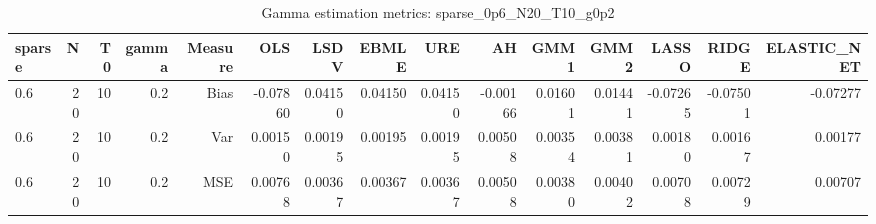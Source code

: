 \begin{table}[!htbp]\centering
\caption{Gamma estimation metrics: sparse_0p6_N20_T10_g0p2}
\label{tab:table1_sparse_0p6_N20_T10_g0p2}
\begin{tabular}{lrrrrrrrrrrrrrr}
\hline
sparse & N & T0 & gamma & Measure & OLS & LSDV & EBMLE & URE & AH & GMM1 & GMM2 & LASSO & RIDGE & ELASTIC_NET \\
\hline
0.6 & 20 & 10 & 0.2 & Bias & -0.07860 & 0.04150 & 0.04150 & 0.04150 & -0.00166 & 0.01601 & 0.01441 & -0.07265 & -0.07501 & -0.07277 \\
0.6 & 20 & 10 & 0.2 & Var & 0.00150 & 0.00195 & 0.00195 & 0.00195 & 0.00508 & 0.00354 & 0.00381 & 0.00180 & 0.00167 & 0.00177 \\
0.6 & 20 & 10 & 0.2 & MSE & 0.00768 & 0.00367 & 0.00367 & 0.00367 & 0.00508 & 0.00380 & 0.00402 & 0.00708 & 0.00729 & 0.00707 \\
\hline
\end{tabular}
\end{table}


